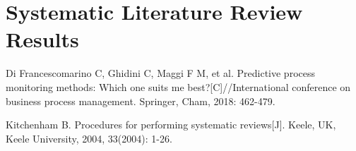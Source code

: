 \documentclass[runningheads]{llncs}
\begin{document}
		
	\section{Systematic Literature Review Results}





		
	\newpage
	\begin{thebibliography}{99}
	
	Di Francescomarino C, Ghidini C, Maggi F M, et al. Predictive process monitoring methods: Which one suits me best?[C]//International conference on business process management. Springer, Cham, 2018: 462-479.
	
	Kitchenham B. Procedures for performing systematic reviews[J]. Keele, UK, Keele University, 2004, 33(2004): 1-26.
		
	\end{thebibliography}

	
\end{document}
